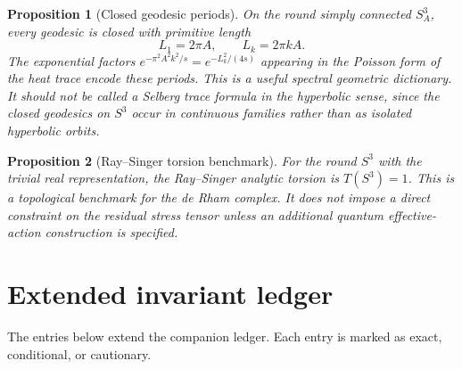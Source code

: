 \documentclass[
  aps,
  prd,
  reprint,
  superscriptaddress,
  nofootinbib,
  floatfix,
  longbibliography
]{revtex4-2}
\newtheorem{proposition}{Proposition}
\begin{document}
\begin{proposition}[Closed geodesic periods]
\label{prop:geo}
On the round simply connected \(S_A^3\), every geodesic is closed with primitive
length
\begin{equation}
  L_1=2\pi A,\qquad L_k=2\pi kA .
\end{equation}
The exponential factors \(e^{-\pi^2A^2k^2/s}=e^{-L_k^2/(4s)}\) appearing in the
Poisson form of the heat trace encode these periods.  This is a useful spectral
geometric dictionary.  It should not be called a Selberg trace formula in the
hyperbolic sense, since the closed geodesics on \(S^3\) occur in continuous
families rather than as isolated hyperbolic orbits.
\end{proposition}

\begin{proposition}[Ray--Singer torsion benchmark]
\label{prop:torsion}
For the round \(S^3\) with the trivial real representation, the Ray--Singer
analytic torsion is \(T(S^3)=1\).  This is a topological benchmark for the
de Rham complex.  It does not impose a direct constraint on the residual stress
tensor unless an additional quantum effective-action construction is specified.
\end{proposition}

\section{Extended invariant ledger}
\label{sec:ledger}

The entries below extend the companion ledger.  Each entry is marked as exact,
conditional, or cautionary.
\end{document}
